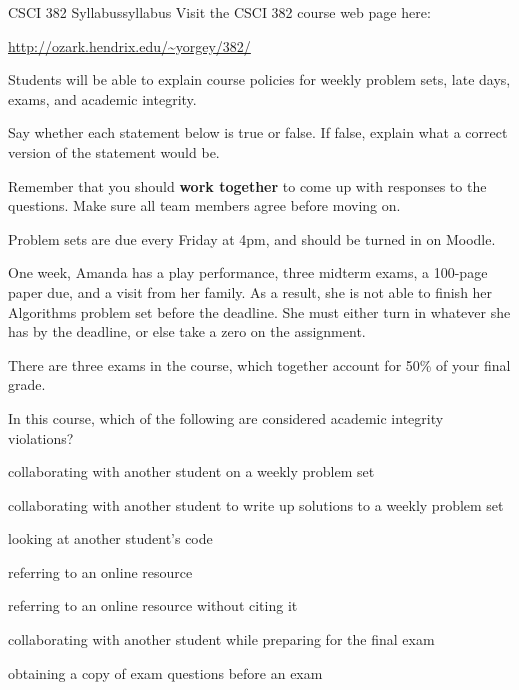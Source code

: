 \documentclass{tufte-handout}
\begin{document}
\newpage
\begin{model*}{CSCI 382 Syllabus}{syllabus}
  Visit the CSCI 382 course web page here: \bigskip

  \url{http://ozark.hendrix.edu/~yorgey/382/}
\end{model*}

\begin{objective}
  Students will be able to explain course policies for weekly problem
  sets, late days, exams, and academic integrity.
\end{objective}

Say whether each statement below is true or false.  If false, explain
what a correct version of the statement would be.

Remember that you should \textbf{work together} to come up with
responses to the questions.  Make sure all team members agree before
moving on.

\begin{questions}
\item Problem sets are due every Friday at 4pm, and should be turned
  in on Moodle.

  \item One week, Amanda has a play performance, three midterm exams,
    a 100-page paper due, and a visit from her family.  As a result, she
    is not able to finish her Algorithms problem set before the
    deadline.  She must either turn in whatever she has by the
    deadline, or else take a zero on the assignment.
  \item There are three exams in the course, which together account for 50\%
    of your final grade.
  \item In this course, which of the following are considered academic
    integrity violations? 
    \begin{compactenum}[(a)]
      \item collaborating with another student on a weekly problem set
      \item collaborating with another student to write up solutions
        to a weekly problem set
      \item looking at another student's code
      \item referring to an online resource
      \item referring to an online resource without citing it
      \item collaborating with another student while preparing for the
        final exam
      \item obtaining a copy of exam questions before an exam
    \end{compactenum}

\end{questions}
\end{document}

